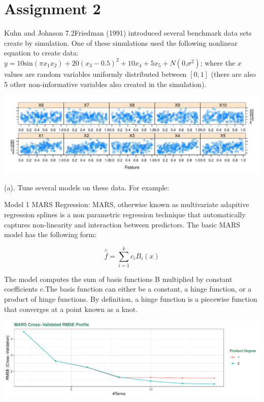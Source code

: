 \documentclass[]{report}
\begin{document}
\hypertarget{AS-2}{%
\chapter*{Assignment 2}\label{AS-2}}


\begin{question}{Kuhn and Johnson 7.2}Friedman (1991) introduced several benchmark data sets create by simulation. One of these simulations used the following nonlinear equation to create data: $y = 10\text{sin}(\pi x_1 x_2)+20(x_3-0.5)^2+10x_4+5x_5+N(0\text{,} \sigma^2)$; where the $x$ values are random variables uniformly distributed between $[0, 1]$ (there are also 5 other non-informative variables also created in the simulation). \end{question}

\includegraphics{Homework-Two_files/figure-latex/kj-7.2-ex1-1.pdf}

\begin{subquestion}{(a).} Tune several models on these data. For example: 
\end{subquestion}

Model 1 MARS Regression: MARS, otherwise known as multivariate adapitive
regression splines is a non parametric regression technique that
automatically captures non-linearity and interaction between predictors.
The basic MARS model has the following form:

\[
\overset { \wedge  }{ f } =\sum _{ i=1 }^{ k }{ { c }_{ i }{ B }_{ i }(x) } 
\]

The model computes the sum of basis functions B multiplied by constant
coefficients c.The basis function can either be a constant, a hinge
function, or a product of hinge functions. By definition, a hinge
function is a piecewise function that converges at a point known as a
knot.

\includegraphics{Homework-Two_files/figure-latex/kj-7.2-1-1.pdf}
\end{document}
